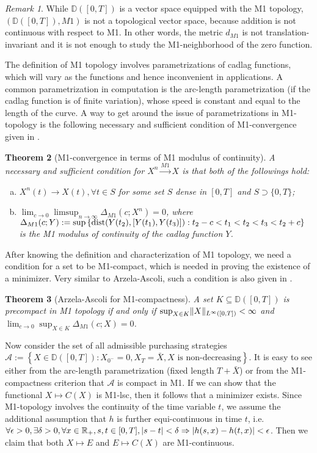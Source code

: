 \documentclass[openany,oneside]{article}
\newtheorem{thm}{Theorem}[section]
\theoremstyle{definition}
\theoremstyle{remark}
\newtheorem{rem}[thm]{Remark}
\DeclarePairedDelimiter{\abs}{\lvert}{\rvert} %
\DeclarePairedDelimiter{\norm}{\lVert}{\rVert} %
\begin{document}
\begin{rem}
While $\mathbb{D}([0,T])$ is a vector space equipped with the M1 topology, $(\mathbb{D}([0,T]), M1)$ is not a topological vector space, because addition is not continuous with respect to M1. In other words, the metric $d_{M1}$ is not translation-invariant and it is not enough to study the M1-neighborhood of the zero function.
\end{rem}

The definition of M1 topology involves parametrizations of cadlag functions, which will vary as the functions and hence inconvenient in applications. A common parametrization in computation is the arc-length parametrization (if the cadlag function is of finite variation), whose speed is constant and equal to the length of the curve. A way to get around the issue of parametrizations in M1-topology is the following necessary and sufficient condition of M1-convergence given in \citet{skorokhod1956limit}.
\begin{thm}[M1-convergence in terms of M1 modulus of continuity]
A necessary and sufficient condition for $X^n \xrightarrow{M1} X$ is that both of the followings hold:
\begin{enumerate}[(a)]
\item $X^n(t) \to X(t), \forall t\in S$ for some set $S$ dense in $[0,T]$ and $S\supset\{0,T\}$;
\item $\lim_{c\to 0} \limsup_{n\to\infty} \Delta_{M1}(c;X^n) =0$, where $\Delta_{M1}(c;Y) := \sup\left\{{\rm dist}(Y(t_2), [Y(t_1),Y(t_3)]) : t_2-c < t_1 < t_2 < t_3 < t_2+c \right\}$ is the M1 modulus of continuity of the cadlag function $Y$.
\end{enumerate}
\end{thm}

After knowing the definition and characterization of M1 topology, we need a condition for a set to be M1-compact, which is needed in proving the existence of a minimizer. Very similar to Arzela-Ascoli, such a condition is also given in \citet{skorokhod1956limit}.
\begin{thm}[Arzela-Ascoli for M1-compactness]
A set $K\subseteq \mathbb{D}([0,T])$ is precompact in M1 topology if and only if $\sup_{X\in K} \norm{X}_{L^\infty([0,T])} < \infty$ and $\lim_{c\to 0} \sup_{X\in K} \Delta_{M1}(c;X) = 0$.
\end{thm}

Now consider the set of all admissible purchasing strategies $\mathcal{A}:=\left\{X\in \mathbb{D}([0,T]) : X_{0^-}=0, X_T = \bar{X}, X \textrm{ is non-decreasing} \right\}$. It is easy to see either from the arc-length parametrization (fixed length $T+\bar{X}$) or from the M1-compactness criterion that $\mathcal{A}$ is compact in M1. If we can show that the functional $X\mapsto C(X)$ is M1-lsc, then it follows that a minimizer exists. Since M1-topology involves the continuity of the time variable $t$, we assume the additional assumption that $h$ is further equi-continuous in time $t$, i.e. $\forall \epsilon>0, \exists \delta>0, \forall x\in\mathbb{R}_+, s,t\in[0,T], \abs{s-t}<\delta \Rightarrow \abs{h(s,x)-h(t,x)}<\epsilon$. Then we claim that both $X\mapsto E$ and $E\mapsto C(X)$ are M1-continuous.
\end{document}
